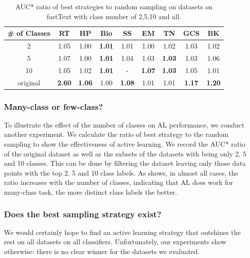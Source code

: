 \begin{table}[!th]
	\small
	\centering
	\begin{tabular}{ccccccccc}
		\toprule
		\# of Classes  & RT & HP & Bio & SS & EM & TN & GCS & BK \\ \hline
		2  & 1.05  & 1.00 & \textbf{1.01} & 1.01 & 1.00 & 1.02  & 1.03 & 1.02\\
		5   & 1.07 & 1.00 & \textbf{1.01} & 1.04 & 1.03 & \textbf{1.03} & 1.03 & 1.06\\
		10 & 1.05 & 1.02 & \textbf{1.01} & - & \textbf{1.07} & \textbf{1.03}  & 1.05  &  1.01\\
		original  & \textbf{2.60} & \textbf{1.06} & 1.00 & \textbf{1.08} & 1.01 & 1.01  & \textbf{1.17}  & \textbf{1.20}\\ 
		\bottomrule              
	\end{tabular}
\caption{AUC* ratio of best strategies to random sampling on datasets on fastText with class number of 2,5,10 and all.}
\label{table:ratioOfDataset}
\end{table}



\subsubsection{Many-class or few-class?}
To illustrate the effect of the number of classes on AL performance, 
we conduct another experiment. We calculate the ratio of best strategy to 
the random sampling to show the effectiveness of active learning. 
We record the AUC* ratio of the original dataset as well as the subsets 
of the datasets with being only 2, 5 and 10 classes. This can be done by
filtering the dataset leaving only those data points with the top 2, 5 and 10 
class labels. 
As  shows, in almost all cases, 
the ratio increases with the number of classes, indicating that AL does work 
for many-class task, the more distinct class labels the better.

\subsubsection{Does the best sampling strategy exist?}
We would certainly hope to find an active learning strategy 
that outshines the rest on all datasets on all classifiers. 
Unfortunately, our experiments show otherwise: there is no clear winner 
for the datasets we evaluated. 

